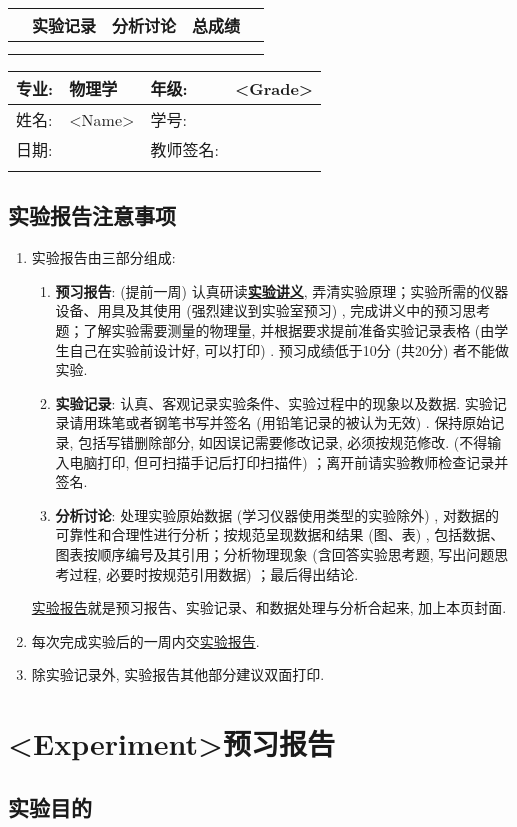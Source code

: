 \documentclass{ctexart}
\title{\experimentname}
\author{\stuID \student}
\date{\today}
\newcommand{\experimentname}{<Experiment>}
\newcommand{\student}{<Name>}
\newcommand{\Grade}{<Grade>}
\newcommand{\stuID}{<Student ID>}
\newcommand{\previewdate}{<Preview Date>}
\newcommand{\inlinemaketitle}{{\let\newpage\relax\maketitle}}
\numberwithin{equation}{section}%
\theoremstyle{ansstyle}
\newcommand{\infotable}{%
    \begin{center}
        \begin{tabular}{|p{1.49cm}<{\centering}|p{1.49cm}<{\centering}|p{1.49cm}<{\centering}|p{1.49cm}<{\centering}|p{1.49cm}<{\centering}|p{1.49cm}<{\centering}|p{1.49cm}<{\centering}|p{1.49cm}<{\centering}|}
            \specialrule{0em}{0.3cm}{0cm}
            \hline
            \multicolumn{2}{|c|}{\LARGE 预习实验} & \multicolumn{2}{c|}{\LARGE 实验记录}& \multicolumn{2}{c|}{\LARGE 分析讨论} & \multicolumn{2}{c|}{\LARGE 总成绩} \\
            \hline
            &&&&&&& \\
            \hline
            \specialrule{0em}{0.3cm}{0cm}
        \end{tabular}
    \end{center}%
}
\newcommand{\previewdata}{%
    \begin{center}
        \begin{tabular}{|p{1.5cm}|p{4.5cm}|p{4cm}|p{3.65cm}|}
            \hline
            {\large 专业}:  & {\large 物理学}    & {\large 年级: }    & {\large \Grade} \\
            \hline
            {\large 姓名: } & {\large \student} & {\large 学号: }    & {\large \stuID} \\
            \hline
            {\large 日期: } & {\large \previewdate} & {\large 教师签名: } & \\
            \hline
            \specialrule{0em}{0.6cm}{0cm}
        \end{tabular}
    \end{center}%
}
\begin{document}
\noindent
\renewcommand\arraystretch{1.8}
\infotable

\renewcommand\arraystretch{1.3}
\previewdata

\inlinemaketitle
\tableofcontents

\subsection{实验报告注意事项}
    
\begin{enumerate}
    \item 实验报告由三部分组成: 
    \begin{enumerate}
        \item \textbf{预习报告}: 
         (提前一周) 认真研读\underline{\textbf{实验讲义}}, 弄清实验原理；实验所需的仪器设备、用具及其使用 (强烈建议到实验室预习) , 完成讲义中的预习思考题；了解实验需要测量的物理量, 并根据要求提前准备实验记录表格 (由学生自己在实验前设计好, 可以打印) . 预习成绩低于10分 (共20分) 者不能做实验. 
        \item \textbf{实验记录}: 
        认真、客观记录实验条件、实验过程中的现象以及数据. 实验记录请用珠笔或者钢笔书写并签名 ({\color{red}用铅笔记录的被认为无效}) . {\color{red}保持原始记录, 包括写错删除部分, 如因误记需要修改记录, 必须按规范修改. } (不得输入电脑打印, 但可扫描手记后打印扫描件) ；离开前请实验教师检查记录并签名. 
        \item \textbf{分析讨论}: 
        处理实验原始数据 (学习仪器使用类型的实验除外) , 对数据的可靠性和合理性进行分析；按规范呈现数据和结果 (图、表) , 包括数据、图表按顺序编号及其引用；分析物理现象 (含回答实验思考题, 写出问题思考过程, 必要时按规范引用数据) ；最后得出结论. 
    \end{enumerate}
    \underline{实验报告}就是预习报告、实验记录、和数据处理与分析合起来, 加上本页封面. 
    \item 每次完成实验后的一周内交\underline{实验报告}. 
    \item 除实验记录外, 实验报告其他部分建议双面打印. 
\end{enumerate}


\section*{\experimentname 预习报告}

\subsection{实验目的}
\end{document}
